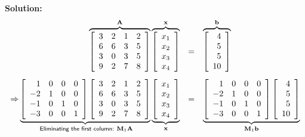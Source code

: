 {\bf Solution:} \vspace{-1cm}
$$\begin{array}{rcl}
\overbrace{\left[\begin{array}{rrrr}3&2&1&2\\6&6&3&5\\3&0&3&5\\9&2&7&8\end{array}\right]}^{\mathbf{A}}
\overbrace{\left[\begin{array}{r}x_1\\x_2\\x_3\\x_4\end{array}\right]}^{\mathbf{x}} & = &
\overbrace{\left[\begin{array}{r}4\\5\\5\\10\end{array}\right]}^{\mathbf{b}} \\ \vspace*{-1mm}\\ {\Rightarrow}
\underbrace{ {\left[\begin{array}{rrrr}1&0&0&0\\-2&1&0&0\\-1&0&1&0\\-3&0&0&1\end{array}\right]}
\left[\begin{array}{rrrr}3&2&1&2\\6&6&3&5\\3&0&3&5\\9&2&7&8\end{array}\right]}_{\textsf{ Eliminating the first column: } {\mathbf{M}_1}\mathbf{A}}
\underbrace{\left[\begin{array}{r}x_1\\x_2\\x_3\\x_4\end{array}\right]}_{\mathbf{x}} &=& 
\underbrace{ {\left[\begin{array}{rrrr}1&0&0&0\\-2&1&0&0\\-1&0&1&0\\-3&0&0&1\end{array}\right]}
\left[\begin{array}{r}4\\5\\5\\10\end{array}\right]}_{ {\mathbf{M}_1}\mathbf{b}}
\end{array}$$
